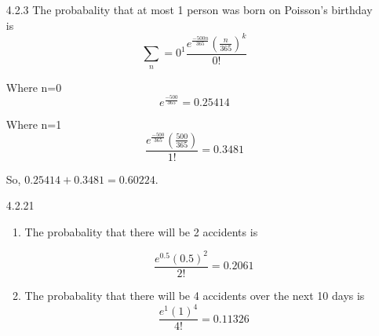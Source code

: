 \documentclass[11pt,fleqn]{article}
\begin{document}
\begin{enumerate}
\item[4.2.3]
The probabality that at most 1 person was born on Poisson's birthday is
\[
\sum_n=0^1 \frac{e^{\frac{-500n}{365}}(\frac{n}{365})^k} {0!}
\]

Where n=0 
\[
e^{ \frac{-500}{365}  } = 0.25414
\]

Where n=1
\[
\frac{ e^{\frac{-500}{365}}(\frac{500}{365})  }{ 1!  } = 0.3481
\]
 
So, $0.25414 + 0.3481 = 0.60224$.

\item[4.2.21]
\begin{enumerate}

\item
The probabality that there will be 2 accidents is

\[
\frac{e^{0.5}(0.5)^{2}}{2!} = 0.2061
\]
  
\item
The probabality that there will be 4 accidents over the next 10 days is
\[
\frac{e^1(1)^4}{4!} = 0.11326
\]

\end{enumerate}


\end{enumerate}
\end{document}
